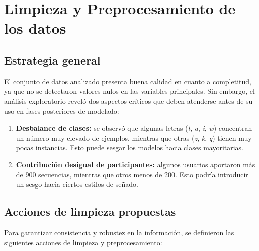 \documentclass[12pt]{article}
\begin{document}
\section{Limpieza y Preprocesamiento de los datos}

\subsection{Estrategia general}
El conjunto de datos analizado presenta buena calidad en cuanto a completitud, ya que no se detectaron valores nulos en las variables principales. Sin embargo, el análisis exploratorio reveló dos aspectos críticos que deben atenderse antes de su uso en fases posteriores de modelado:

\begin{enumerate}
    \item \textbf{Desbalance de clases:} se observó que algunas letras (\textit{t}, \textit{a}, \textit{i}, \textit{w}) concentran un número muy elevado de ejemplos, mientras que otras (\textit{z}, \textit{k}, \textit{q}) tienen muy pocas instancias. Esto puede sesgar los modelos hacia clases mayoritarias.
    \item \textbf{Contribución desigual de participantes:} algunos usuarios aportaron más de 900 secuencias, mientras que otros menos de 200. Esto podría introducir un sesgo hacia ciertos estilos de señado.
\end{enumerate}

\subsection{Acciones de limpieza propuestas}
Para garantizar consistencia y robustez en la información, se definieron las siguientes acciones de limpieza y preprocesamiento:
\end{document}
